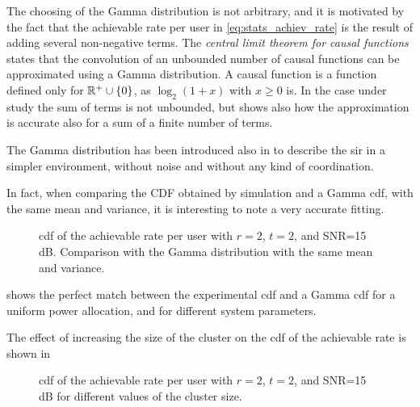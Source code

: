 The choosing of the Gamma distribution is not arbitrary, and it is motivated by
the fact that the achievable rate per user in \eqref{eq:stats_achiev_rate} is
the result of adding several non-negative terms. The \emph{central limit theorem
for causal functions} \cite{papoulis_fourier} states that the convolution of an
unbounded number of causal functions can be approximated using a Gamma
distribution. A causal function is a function defined only for $\mathbb{R}^{+}
\cup \left\{0\right\}$, as $\log_2\left(1+x\right)$ with $x \geq 0$ is. In the
case under study the sum of terms is not unbounded, but \cite{papoulis_fourier}
shows also how the approximation is accurate also for a sum of a finite number
of terms.

The Gamma distribution has been introduced also in \cite{cheikh11} to describe
the \gls{sir} in a simpler environment, without noise and without any kind of
coordination.

In fact, when comparing the CDF obtained by simulation and a Gamma \gls{cdf},
with the same mean and variance, it is interesting to note a very accurate
fitting.

\begin{figure}[t]
\begin{center}
    
    \restoregeometry
\end{center}
\caption{\gls{cdf} of the achievable rate per user with $r=2$, $t=2$, and
SNR=15\,dB. Comparison with the Gamma distribution with the same mean and
variance.}
\label{fig:cdf_sim_analy}
\end{figure}

 shows the perfect match between the experimental
\gls{cdf} and a Gamma \gls{cdf} for a uniform power allocation, and for
different system parameters.

The effect of increasing the size of the cluster on the \gls{cdf} of the
achievable rate is shown in 

\begin{figure}[t]
\begin{center}
    
    \restoregeometry
\end{center}
\caption{\gls{cdf} of the achievable rate per user with $r=2$, $t=2$, and
SNR=15\,dB for different values of the cluster size.}
\label{fig:cdf_cluster_size}
\end{figure}


